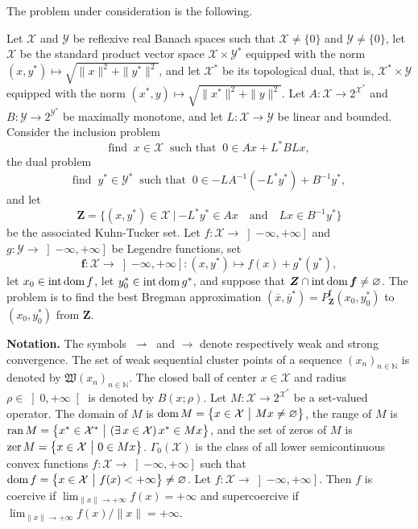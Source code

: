 \documentclass[a4paper,11pt,fleqn]{article}
\newcommand{\menge}[2]{\big\{{#1}~\big |~{#2}\big\}}
\newcommand{\RX}{\ensuremath{\left]-\infty,+\infty\right]}}
\newcommand{\XX}{\ensuremath{{\mathcal X}}}
\newcommand{\WC}{\ensuremath{{\mathfrak W}}}
\newcommand{\XXX}{\ensuremath{\boldsymbol{\mathcal X}}}
\newcommand{\YY}{\ensuremath{{\mathcal Y}}}
\newcommand{\emp}{\ensuremath{{\varnothing}}}
\newcommand{\RPP}{\ensuremath{\left]0,+\infty\right[}}
\newcommand{\NN}{\ensuremath{\mathbb N}}
\newcommand{\weakly}{\ensuremath{\:\rightharpoonup\:}}
\newcommand{\exi}{\ensuremath{\exists\,}}
\newcommand{\pinf}{\ensuremath{{+\infty}}}
\newcommand{\dom}{\ensuremath{\text{\rm dom}\,}}
\newcommand{\intdom}{\ensuremath{\text{\rm int\,dom}\,}}
\newcommand{\ran}{\ensuremath{\text{\rm ran}\,}}
\newcommand{\zer}{\ensuremath{\text{\rm zer}\,}}
\theoremstyle{plain}{\theorembodyfont{\rmfamily}%
\newtheorem{conjecture}[theorem]{Conjecture}}
\theoremstyle{plain}{\theorembodyfont{\rmfamily}%
\newtheorem{example}[theorem]{Example}}
\theoremstyle{plain}{\theorembodyfont{\rmfamily}%
\newtheorem{remark}[theorem]{Remark}}
\theoremstyle{plain}{\theorembodyfont{\rmfamily}%
\newtheorem{algorithm}[theorem]{Algorithm}}
\theoremstyle{plain}{\theorembodyfont{\rmfamily}%
\newtheorem{condition}[theorem]{Condition}}
\theoremstyle{plain}{\theorembodyfont{\rmfamily}%
\newtheorem{definition}[theorem]{Definition}}
\theoremstyle{plain}{\theorembodyfont{\rmfamily}
\newtheorem{problem}[theorem]{Problem}}
\theoremstyle{plain}{\theorembodyfont{\rmfamily}
\newtheorem{notation}[theorem]{Notation}}
\numberwithin{equation}{section}
\begin{document}
The problem under consideration is the following.

\begin{problem}
\label{prob:1}
Let $\XX$ and $\YY$ be reflexive real Banach spaces such that
$\XX\neq\{0\}$ and $\YY\neq\{0\}$, let $\XXX$ be the standard 
product vector space $\XX\times\YY^*$ equipped with the norm 
$(x,y^*)\mapsto\sqrt{\|x\|^2+\|y^*\|^2}$, and let $\XXX^*$ be its 
topological dual, that is, $\XX^*\times\YY$ equipped with 
the norm $(x^*,y)\mapsto\sqrt{\|x^*\|^2+\|y\|^2}$.
Let $A\colon\XX\to 2^{\XX^*}$ and 
$B\colon\YY\to 2^{\YY^*}$ be maximally monotone, and
let $L\colon\XX\to\YY$ be linear and bounded. Consider the
inclusion problem
\begin{equation}
\label{Ipb:Ia}
\text{find}\;\;x\in\XX\;\;\text{such that}\;\;0\in Ax+L^*BLx,
\end{equation}
the dual problem
\begin{equation}
\label{Ipb:Ib}
\text{find}\;\;y^*\in\YY^*\;\;\text{such that}\;\; 
0\in -LA^{-1}(-L^*y^*)+B^{-1}y^*,
\end{equation}
and let 
\begin{equation}
\label{IVe:VKT}
\boldsymbol{Z}
=\menge{(x,y^*)\in\boldsymbol{\mathcal{X}}}{-L^*y^*\in Ax
\quad\text{and}\quad Lx\in B^{-1}y^*}
\end{equation}
be the associated Kuhn-Tucker set.
Let $f\colon\XX\to\RX$ and $g\colon\YY\to\RX$ be Legendre 
functions, set
\begin{equation}
\label{epOlk28ha14}
\boldsymbol{f}\colon\XXX\to\RX\colon(x,y^*)\mapsto f(x)+g^*(y^*),
\end{equation}
let $x_0\in\intdom f$, let $y_0^*\in\intdom g^*$, 
and suppose that 
$\boldsymbol{Z}\cap\text{\rm int\,dom}\,\boldsymbol{f}\neq\emp$.
The problem is to find the best Bregman approximation 
$(\overline{x},\overline{y}^*)=P^{\boldsymbol{f}}_{\boldsymbol{Z}}
(x_0,y_0^*)$ to $(x_0,y_0^*)$ from $\boldsymbol{Z}$.
\end{problem}

{\bfseries Notation.} 
The symbols $\weakly$ and $\to$ denote respectively weak and 
strong convergence. The set of weak sequential cluster points 
of a sequence $(x_n)_{n\in\NN}$ is denoted by $\WC(x_n)_{n\in\NN}$.
The closed ball of center $x\in\XX$ and radius $\rho\in\RPP$ is
denoted by $B(x;\rho)$.
Let $M\colon\XX\to 2^{\XX^*}$ be a set-valued operator. The domain 
of $M$ is $\dom M=\menge{x\in\XX}{Mx\neq\emp}$, the range of 
$M$ is $\ran M=\menge{x^*\in\XX^*}{(\exi x\in\XX)\,x^*\in Mx}$, 
and the set of zeros of $M$ is $\zer M=\menge{x\in\XX}{0\in Mx}$. 
$\Gamma_0(\XX)$ is the class of all lower semicontinuous convex 
functions $f\colon\XX\to\RX$ such that 
$\dom f=\menge{x\in\XX}{f(x)<\pinf}\neq\emp$. 
Let $f\colon\XX\to\RX$. Then $f$ is coercive if 
$\lim_{\|x\|\to+\infty}f(x)=+\infty$ and supercoercive if 
$\lim_{\|x\|\to+\infty}f(x)/\|x\|=+\infty$.
\end{document}

